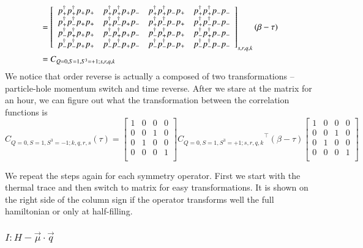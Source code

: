 \begin{equation}
  \begin{aligned}
    &= \left[ 
    \begin{array}{cccc}
      p^\dagger_{+}p^\dagger_{+}p_{+}p_{+} & p^\dagger_{+}p^\dagger_{+}p_{+}p_{-} & p^\dagger_{+}p^\dagger_{+}p_{-}p_{+} & p^\dagger_{+}p^\dagger_{+}p_{-}p_{-} \\
      p^\dagger_{+}p^\dagger_{-}p_{+}p_{+} & p^\dagger_{+}p^\dagger_{-}p_{+}p_{-} & p^\dagger_{+}p^\dagger_{-}p_{-}p_{+} & p^\dagger_{+}p^\dagger_{-}p_{-}p_{-} \\
      p^\dagger_{-}p^\dagger_{+}p_{+}p_{+} & p^\dagger_{-}p^\dagger_{+}p_{+}p_{-} & p^\dagger_{-}p^\dagger_{+}p_{-}p_{+} & p^\dagger_{-}p^\dagger_{+}p_{-}p_{-} \\
      p^\dagger_{-}p^\dagger_{-}p_{+}p_{+} & p^\dagger_{-}p^\dagger_{-}p_{+}p_{-} & p^\dagger_{-}p^\dagger_{-}p_{-}p_{+} & p^\dagger_{-}p^\dagger_{-}p_{-}p_{-} \\
    \end{array} \right]_{s,r,q,k} (\beta-\tau) \\
    &= C_{Q=0,S=1,S^3=+1;s,r,q,k}
  \end{aligned}
\end{equation}
We notice that order reverse is actually a composed of two transformations -- particle-hole momentum switch and time reverse. After we stare at the matrix for an hour, we can figure out what the transformation between the correlation functions is
\begin{equation}
  C_{Q=0,S=1,S^3=-1;k,q,r,s} (\tau) =
  \left[ {\begin{array}{cccc}
    1 & 0 & 0 & 0 \\
    0 & 0 & 1 & 0 \\
    0 & 1 & 0 & 0 \\
    0 & 0 & 0 & 1 \\
  \end{array} } \right]
  {C_{Q=0,S=1,S^3=+1;s,r,q,k}}^\top (\beta-\tau)
  \left[ {\begin{array}{cccc}
    1 & 0 & 0 & 0 \\
    0 & 0 & 1 & 0 \\
    0 & 1 & 0 & 0 \\
    0 & 0 & 0 & 1 \\
  \end{array} } \right]
\end{equation}

We repeat the steps again for each symmetry operator. First we start with the thermal trace and then switch to matrix for easy transformations. It is shown on the right side of the column sign if the operator transforms well the full hamiltonian or only at half-filling.\\

\subsubsection{\underline{$I : H - \vec{\mu}\cdot\vec{q}$}}

